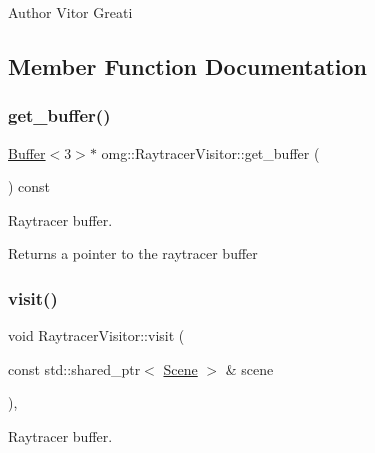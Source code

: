 \begin{DoxyAuthor}{Author}
Vitor Greati 
\end{DoxyAuthor}


\subsection{Member Function Documentation}
\mbox{\label{classomg_1_1_raytracer_visitor_a02b6a31ad96feae340a34be792fa698e}} 
\subsubsection{\texorpdfstring{get\_buffer()}{get\_buffer()}}
{\footnotesize\ttfamily \mbox{\hyperlink{classomg_1_1_buffer}{Buffer}}$<$3$>$$\ast$ omg\+::\+Raytracer\+Visitor\+::get\+\_\+buffer (\begin{DoxyParamCaption}{ }\end{DoxyParamCaption}) const\hspace{0.3cm}{\ttfamily [inline]}}



Raytracer buffer. 

\begin{DoxyReturn}{Returns}
a pointer to the raytracer buffer 
\end{DoxyReturn}
\mbox{\label{classomg_1_1_raytracer_visitor_ac469c21e8ac5e9a01ca6a58108bc860e}} 
\subsubsection{\texorpdfstring{visit()}{visit()}}
{\footnotesize\ttfamily void Raytracer\+Visitor\+::visit (\begin{DoxyParamCaption}\item[{const std\+::shared\+\_\+ptr$<$ \mbox{\hyperlink{classomg_1_1_scene}{Scene}} $>$ \&}]{scene }\end{DoxyParamCaption})\hspace{0.3cm}{\ttfamily [override]}, {\ttfamily [virtual]}}



Raytracer buffer. 

